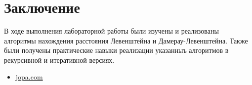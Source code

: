 \documentclass[12pt]{report}
\begin{document}
\chapter*{Заключение}
В ходе выполнения лабораторной работы были изучены и реализованы алгоритмы нахождения расстояния Левенштейна и Дамерау-Левенштейна. Также были получены практические навыки реализации указанныъ алгоритмов в рекурсивной и итеративной версиях.


\begin{itemize}
\item \url{jopa.com}
\end{itemize}
\end{document}
